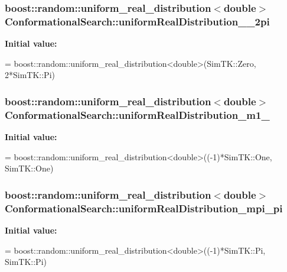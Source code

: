 \subsubsection[{\texorpdfstring{uniform\+Real\+Distribution\+\_\+0\+\_\+2pi}{uniformRealDistribution_0_2pi}}]{\setlength{\rightskip}{0pt plus 5cm}boost\+::random\+::uniform\+\_\+real\+\_\+distribution$<$double$>$ Conformational\+Search\+::uniform\+Real\+Distribution\+\_\+\_\+2pi\hspace{0.3cm}{\ttfamily [protected]}}\hypertarget{classConformationalSearch_a655470c22c0772aaba13d2a707892034}{}\label{classConformationalSearch_a655470c22c0772aaba13d2a707892034}
{\bfseries Initial value\+:}
\begin{DoxyCode}
=
        boost::random::uniform\_real\_distribution<double>(SimTK::Zero, 2*SimTK::Pi)
\end{DoxyCode}
\subsubsection[{\texorpdfstring{uniform\+Real\+Distribution\+\_\+m1\+\_\+1}{uniformRealDistribution_m1_1}}]{\setlength{\rightskip}{0pt plus 5cm}boost\+::random\+::uniform\+\_\+real\+\_\+distribution$<$double$>$ Conformational\+Search\+::uniform\+Real\+Distribution\+\_\+m1\+\_\hspace{0.3cm}{\ttfamily [protected]}}\hypertarget{classConformationalSearch_a28866d2f85e7abaa8715dfcd72f8dd2c}{}\label{classConformationalSearch_a28866d2f85e7abaa8715dfcd72f8dd2c}
{\bfseries Initial value\+:}
\begin{DoxyCode}
=
        boost::random::uniform\_real\_distribution<double>((-1)*SimTK::One, SimTK::One)
\end{DoxyCode}
\subsubsection[{\texorpdfstring{uniform\+Real\+Distribution\+\_\+mpi\+\_\+pi}{uniformRealDistribution_mpi_pi}}]{\setlength{\rightskip}{0pt plus 5cm}boost\+::random\+::uniform\+\_\+real\+\_\+distribution$<$double$>$ Conformational\+Search\+::uniform\+Real\+Distribution\+\_\+mpi\+\_\+pi\hspace{0.3cm}{\ttfamily [protected]}}\hypertarget{classConformationalSearch_a0d6e470379038b622a72cde9be8749f3}{}\label{classConformationalSearch_a0d6e470379038b622a72cde9be8749f3}
{\bfseries Initial value\+:}
\begin{DoxyCode}
=
        boost::random::uniform\_real\_distribution<double>((-1)*SimTK::Pi, SimTK::Pi)
\end{DoxyCode}


